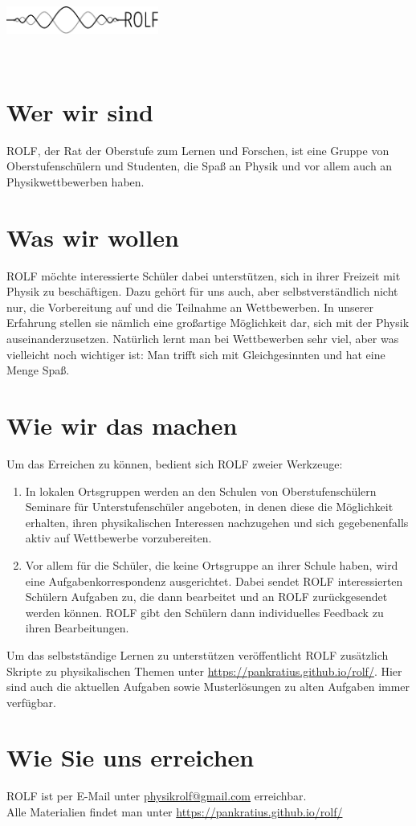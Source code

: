 \documentclass[a4paper]{article}
\begin{document}
	\vspace*{-1cm}
	\parbox{4cm}{\vspace{-0.2cm}\includegraphics[width=5cm]{../task/images/logo_scaled.pdf}}
	\parbox{12.5cm}{ }\\
		\vspace{0.5cm}

\thispagestyle{empty}


\noindent

\section*{Wer wir sind}
ROLF, der Rat der Oberstufe zum Lernen und Forschen, ist eine Gruppe von Oberstufenschülern und Studenten, die Spaß an Physik und vor allem auch an Physikwettbewerben haben.

\section*{Was wir wollen}
ROLF möchte interessierte Schüler dabei unterstützen, sich in ihrer Freizeit mit Physik zu beschäftigen. Dazu gehört für uns auch, aber selbstverständlich nicht nur, die Vorbereitung auf und die Teilnahme an Wettbewerben. In unserer Erfahrung stellen sie nämlich eine großartige Möglichkeit dar, sich mit der Physik auseinanderzusetzen. Natürlich lernt man bei Wettbewerben sehr viel, aber was vielleicht noch wichtiger ist: Man trifft sich mit Gleichgesinnten und hat eine Menge Spaß.  

\section*{Wie wir das machen}
Um das Erreichen zu können, bedient sich ROLF zweier Werkzeuge:
\begin{enumerate}
\item In lokalen Ortsgruppen werden an den Schulen von Oberstufenschülern Seminare für Unterstufenschüler angeboten, in denen diese die Möglichkeit erhalten, ihren physikalischen Interessen nachzugehen und sich gegebenenfalls aktiv auf Wettbewerbe vorzubereiten.
\item Vor allem für die Schüler, die keine Ortsgruppe an ihrer Schule haben, wird eine Aufgabenkorrespondenz ausgerichtet. Dabei sendet ROLF interessierten Schülern Aufgaben zu, die dann bearbeitet und an ROLF zurückgesendet werden können. ROLF gibt den Schülern dann individuelles Feedback zu ihren Bearbeitungen.   
\end{enumerate}
Um das selbstständige Lernen zu unterstützen veröffentlicht ROLF zusätzlich Skripte zu physikalischen Themen unter \url{https://pankratius.github.io/rolf/}. Hier sind auch die aktuellen Aufgaben sowie Musterlösungen zu alten Aufgaben immer verfügbar.

\section*{Wie Sie uns erreichen}
ROLF ist per E-Mail unter \url{physikrolf@gmail.com} erreichbar.\\
Alle Materialien findet man unter \url{https://pankratius.github.io/rolf/}     
\end{document}
